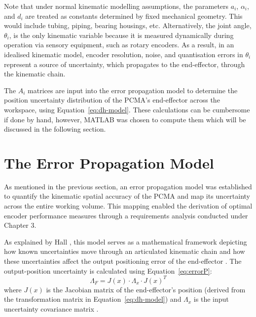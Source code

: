 Note that under normal kinematic modelling assumptions, the parameters $a_i$, $\alpha_i$, and $d_i$ are treated as constants determined by fixed mechanical geometry. This would include tubing, piping, bearing housings, etc. Alternatively, the joint angle, $\theta_i$, is the only kinematic variable because it is measured dynamically during operation via sensory equipment, such as rotary encoders. As a result, in an idealised kinematic model, encoder resolution, noise, and quantisation errors in $\theta_i$ represent a source of uncertainty, which propagates to the end-effector, through the kinematic chain.

The $A_i$ matrices are input into the error propagation model to determine the position uncertainty distribution of the PCMA's end-effector across the workspace, using Equation~\ref{eq:dh-model}. These calculations can be cumbersome if done by hand, however, MATLAB was chosen to compute them which will be discussed in the following section.

\section{The Error Propagation Model}

As mentioned in the previous section, an error propagation model was established to quantify the kinematic spatial accuracy of the PCMA and map its uncertainty across the entire working volume. This mapping enabled the derivation of optimal encoder performance measures through a requirements analysis conducted under Chapter 3.

As explained by Hall \citep{Hall:2010}, this model serves as a mathematical framework depicting how known uncertainties move through an articulated kinematic chain and how these uncertainties affect the output positioning error of the end-effector \citep{Hall:2010}. The output-position uncertainty is calculated using Equation~\ref{eq:errorP}:
\begin{equation}
	\label{eq:errorP}
	\Lambda_F = J(x) \cdot \Lambda_x \cdot J(x)^T
\end{equation}
where $J(x)$ is the Jacobian matrix of the end-effector's position (derived from the transformation matrix in Equation~\ref{eq:dh-model}) and $\Lambda_x$ is the input uncertainty covariance matrix \citep{Hall:2010}.

